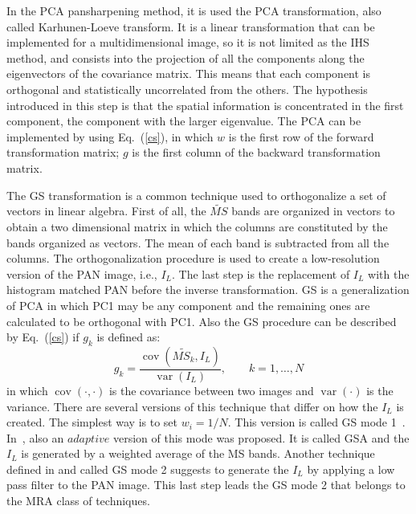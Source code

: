 \documentclass[12pt]{report}
\begin{document}
In the PCA pansharpening method, it is used the PCA transformation, also called Karhunen-Loeve transform. It is a linear transformation that can be implemented for a multidimensional image, so it is not limited as the IHS method, and consists into the projection of all the components along the eigenvectors of the covariance matrix. This means that each component is orthogonal and statistically uncorrelated from the others. The hypothesis introduced in this step is that the spatial information is concentrated in the first component, the component with the larger eigenvalue. The PCA can be implemented by using Eq.~(\ref{cs}), in which $w$ is the first row of the forward transformation matrix; $g$ is the first column of the backward transformation matrix.

The GS transformation is a common technique used to orthogonalize a set of vectors in linear algebra.
First of all, the $\widetilde{MS}$ bands are organized in vectors to obtain a two dimensional matrix in which the columns are constituted by the bands organized as vectors. The mean of each band is subtracted from all the columns. The orthogonalization procedure is used to create a low-resolution version of the PAN image, i.e., $I_L$.  The last step is the replacement of $I_L$ with the histogram matched PAN before the inverse transformation. GS is a generalization of PCA in which PC1 may be any component and the remaining ones are calculated to be orthogonal with PC1. Also the GS procedure can be described by Eq.~(\ref{cs}) if $g_k$ is defined as:
%
\begin{equation}
    g_k = \frac{\operatorname{cov}(\widetilde{MS_k}, I_L)}{\operatorname{var}(I_L)} , \qquad k = 1,\dots,N
    \label{gsgk}
\end{equation}
%
in which $\operatorname{cov}(\cdot,\cdot)$ is the covariance between two images and $\operatorname{var}(\cdot)$ is the variance.
There are several versions of this technique that differ on how the $I_L$ is
created. The simplest way is to set $w_i = 1/N$. This version is called 
GS mode 1~\cite{gs}. In~\cite{cs3}, also an $adaptive$ version of this mode was proposed. It is called GSA and the $I_L$ is generated by a weighted average of 
the MS bands. Another technique defined in \cite{gs} and called GS mode 2 
suggests to generate the $I_L$ by applying a low pass filter to the PAN image. 
This last step leads the GS mode 2 that belongs to the MRA class of techniques.
\end{document}
